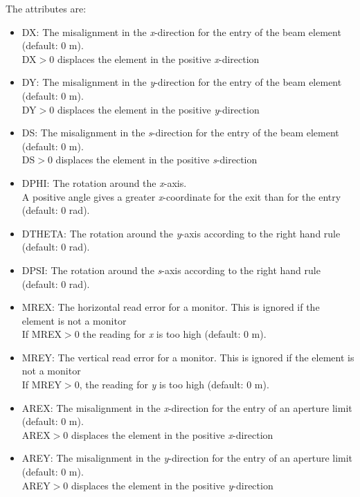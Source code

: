 The attributes are: 
\begin{itemize}
\item DX: The misalignment in the \textit{x}-direction for the entry of
  the beam element (default: 0 m).  
\\ DX$>$0 displaces the element in the positive \textit{x}-direction 

\item DY: The misalignment in the \textit{y}-direction for the entry of
  the beam element (default: 0 m).  
\\ DY$>$0 displaces the element in the positive \textit{y}-direction 

\item DS: The misalignment in the \textit{s}-direction for the entry of
  the beam element (default: 0 m).  
\\ DS$>$0 displaces the element in the positive \textit{s}-direction 

\item DPHI: The rotation around the \textit{x}-axis. 
\\ A positive angle gives a greater \textit{x}-coordinate for the exit
than for the entry (default: 0 rad).  

\item DTHETA: The rotation around the \textit{y}-axis according to the
  right hand rule (default: 0 rad).  

\item DPSI: The rotation around the \textit{s}-axis according to the
  right hand rule (default: 0 rad).  

\item MREX: The horizontal read error for a monitor. This is ignored if
  the element is not a monitor  
\\ If MREX$>$0 the reading for \textit{x} is too high (default: 0 m). 

\item MREY: The vertical read error for a monitor. This is ignored if
  the element is not a monitor  
\\ If MREY$>$0, the reading for \textit{y} is too high (default: 0 m). 

\item AREX: The misalignment in the \textit{x}-direction for the entry
  of an aperture limit (default: 0 m).  
\\ AREX$>$0 displaces the element in the positive \textit{x}-direction 

\item AREY: The misalignment in the \textit{y}-direction for the entry
  of an aperture limit (default: 0 m).  
\\ AREY$>$0 displaces the element in the positive \textit{y}-direction 


\end{itemize}
